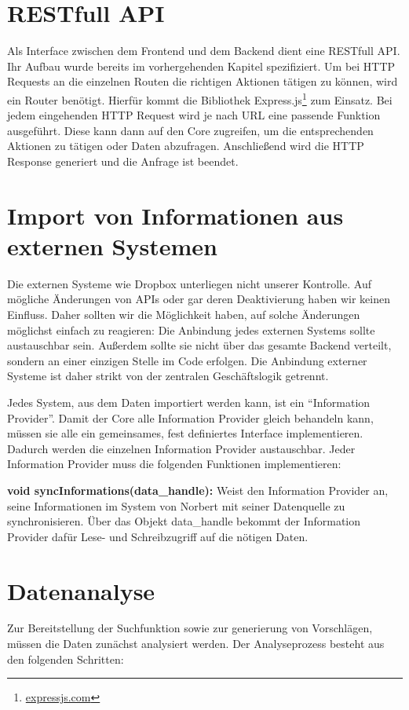 	\section{RESTfull API} %
	\label{sec:restfull_api}
		Als Interface zwischen dem Frontend und dem Backend dient eine RESTfull API. Ihr Aufbau wurde bereits im vorhergehenden Kapitel spezifiziert. Um bei HTTP Requests an die einzelnen Routen die richtigen Aktionen tätigen zu können, wird ein Router benötigt. Hierfür kommt die Bibliothek Express.js\footnote{\url{expressjs.com}} zum Einsatz. Bei jedem eingehenden HTTP Request wird je nach URL eine passende Funktion ausgeführt. Diese kann dann auf den Core zugreifen, um die entsprechenden Aktionen zu tätigen oder Daten abzufragen. Anschließend wird die HTTP Response generiert und die Anfrage ist beendet.

	\section{Import von Informationen aus externen Systemen} %
	\label{sec:import_von_informationen_aus_externen_systemen}
		Die externen Systeme wie Dropbox unterliegen nicht unserer Kontrolle. Auf mögliche Änderungen von APIs oder gar deren Deaktivierung haben wir keinen Einfluss. Daher sollten wir die Möglichkeit haben, auf solche Änderungen möglichst einfach zu reagieren: Die Anbindung jedes externen Systems sollte austauschbar sein. Außerdem sollte sie nicht über das gesamte Backend verteilt, sondern an einer einzigen Stelle im Code erfolgen. Die Anbindung externer Systeme ist daher strikt von der zentralen Geschäftslogik getrennt.

		Jedes System, aus dem Daten importiert werden kann, ist ein \enquote{Information Provider}. Damit der Core alle Information Provider gleich behandeln kann, müssen sie alle ein gemeinsames, fest definiertes Interface implementieren. Dadurch werden die einzelnen Information Provider austauschbar. Jeder Information Provider muss die folgenden Funktionen implementieren:

		\textbf{void syncInformations(data\_handle): } Weist den Information Provider an, seine Informationen im System von Norbert mit seiner Datenquelle zu synchronisieren. Über das Objekt data\_handle bekommt der Information Provider dafür Lese- und Schreibzugriff auf die nötigen Daten.
		 
	\section{Datenanalyse} %
	\label{sec:datenanalyse}
		Zur Bereitstellung der Suchfunktion sowie zur generierung von Vorschlägen, müssen die Daten zunächst analysiert werden. Der Analyseprozess besteht aus den folgenden Schritten:


